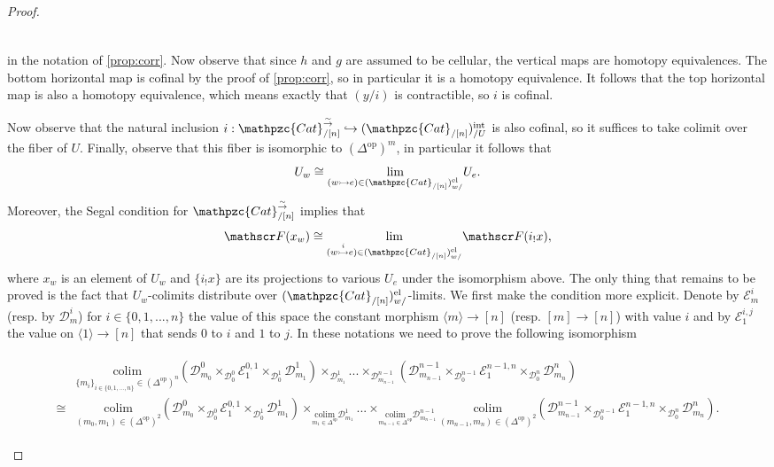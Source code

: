 \documentclass[a4paper, reqno]{amsart}
\theoremstyle{definition}
\newcommand\cD{\mathscr D}
\newcommand\cE{\mathscr E}
\newcommand\cF{\mathscr F}
\newcommand\op{\mathrm{op}}
\newcommand\ccat{\mathpzc{Cat}}
\newcommand\colim{\mathrm{colim}}
\newcommand\bm{\langle m\rangle}
\newcommand\wrr{{\overset{\sim}{\rightarrow}}}
\newcommand\inrt{\mathrm{int}}
\newcommand\el{\mathrm{el}}
\begin{document}
\begin{proof}
\[\begin{tikzcd}[row sep=huge, column sep=huge]
\end{tikzcd}
\]
in the notation of \cref{prop:corr}. Now observe that since $h$ and $g$ are assumed to be cellular, the vertical maps are homotopy equivalences. The bottom horizontal map is cofinal by the proof of \cref{prop:corr}, so in particular it is a homotopy equivalence. It follows that the top horizontal map is also a homotopy equivalence, which means exactly that $(y/i)$ is contractible, so $i$ is cofinal.\par
Now observe that the natural inclusion $i:\ccat^\wrr_{/[n]}\hookrightarrow(\ccat_{/[n]})^\inrt_{/U}$ is also cofinal, so it suffices to take colimit over the fiber of $U$. Finally, observe that this fiber is isomorphic to $(\Delta^\op)^{m}$, in particular it follows that \[U_w\cong\underset{(w\rightarrowtail e)\in(\ccat_{/[n]})^\el_{w/}}{\lim}U_e.\] 
Moreover, the Segal condition for $\ccat^\wrr_{/[n]}$ implies that \[\cF(x_w)\cong\underset{(w\overset{i}{\rightarrowtail} e)\in(\ccat_{/[n]})^\el_{w/}}{\lim}\cF(i_!x),\]
where $x_w$ is an element of $U_w$ and $\{i_!x\}$ are its projections to various $U_e$ under the isomorphism above. The only thing that remains to be proved is the fact that $U_w$-colimits distribute over $(\ccat_{/[n]})^\el_{w/}$-limits. We first make the condition more explicit. Denote by $\cE^i_m$ (resp. by $\cD_m^i$) for $i\in\{0,1,...,n\}$ the value of this space the constant morphism $\bm\rightarrow[n]$ (resp. $[m]\rightarrow[n]$) with value $i$ and by $\cE_1^{i,j}$ the value on $\langle1\rangle\rightarrow[n]$ that sends $0$ to $i$ and $1$ to $j$. In these notations we need to prove the following isomorphism
\begin{tiny}
\begin{align}\label{eq:five}
\begin{split}
    &\underset{\{m_i\}_{i\in\{0,1,...,n\}}\in(\Delta^\op)^n}{\colim} (\cD^0_{m_0}\times_{\cD_0^0}\cE^{0,1}_1\times_{\cD_0^1}\cD^1_{m_1})\times_{\cD^1_{m_1}}...\times_{\cD^{n-1}_{m_{n-1}}}(\cD^{n-1}_{m_{n-1}}\times_{\cD_0^{n-1}}\cE^{n-1,n}_1\times_{\cD_0^{n}}\cD^n_{m_n})\\
    \cong&\underset{(m_0,m_1)\in(\Delta^\op)^2}{\colim}(\cD^0_{m_0}\times_{\cD_0^0}\cE^{0,1}_1\times_{\cD_0^1}\cD^1_{m_1})\times_{\underset{m_1\in\Delta^\op}{\colim}\cD^1_{m_1}}...\times_{\underset{m_{n-1}\in\Delta^\op}{\colim}\cD^{n-1}_{m_{n-1}}}\underset{(m_{n-1},m_n)\in(\Delta^\op)^2}{\colim}(\cD^{n-1}_{m_{n-1}}\times_{\cD_0^{n-1}}\cE^{n-1,n}_1\times_{\cD_0^{n}}\cD^n_{m_n}).
\end{split}    
\end{align}

\end{tiny}
\end{proof}
\end{document}

